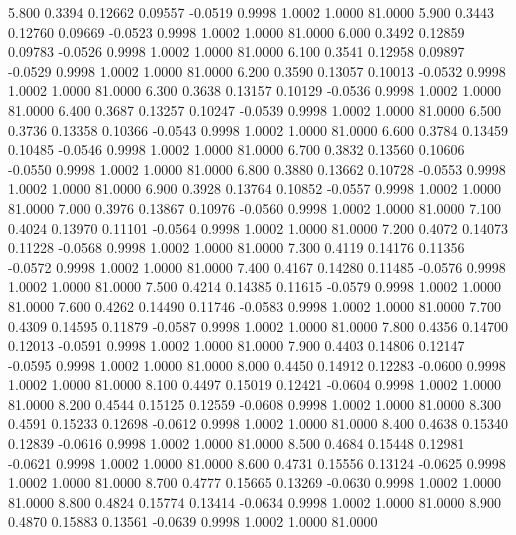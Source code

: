    5.800   0.3394   0.12662   0.09557  -0.0519   0.9998   1.0002   1.0000  81.0000
   5.900   0.3443   0.12760   0.09669  -0.0523   0.9998   1.0002   1.0000  81.0000
   6.000   0.3492   0.12859   0.09783  -0.0526   0.9998   1.0002   1.0000  81.0000
   6.100   0.3541   0.12958   0.09897  -0.0529   0.9998   1.0002   1.0000  81.0000
   6.200   0.3590   0.13057   0.10013  -0.0532   0.9998   1.0002   1.0000  81.0000
   6.300   0.3638   0.13157   0.10129  -0.0536   0.9998   1.0002   1.0000  81.0000
   6.400   0.3687   0.13257   0.10247  -0.0539   0.9998   1.0002   1.0000  81.0000
   6.500   0.3736   0.13358   0.10366  -0.0543   0.9998   1.0002   1.0000  81.0000
   6.600   0.3784   0.13459   0.10485  -0.0546   0.9998   1.0002   1.0000  81.0000
   6.700   0.3832   0.13560   0.10606  -0.0550   0.9998   1.0002   1.0000  81.0000
   6.800   0.3880   0.13662   0.10728  -0.0553   0.9998   1.0002   1.0000  81.0000
   6.900   0.3928   0.13764   0.10852  -0.0557   0.9998   1.0002   1.0000  81.0000
   7.000   0.3976   0.13867   0.10976  -0.0560   0.9998   1.0002   1.0000  81.0000
   7.100   0.4024   0.13970   0.11101  -0.0564   0.9998   1.0002   1.0000  81.0000
   7.200   0.4072   0.14073   0.11228  -0.0568   0.9998   1.0002   1.0000  81.0000
   7.300   0.4119   0.14176   0.11356  -0.0572   0.9998   1.0002   1.0000  81.0000
   7.400   0.4167   0.14280   0.11485  -0.0576   0.9998   1.0002   1.0000  81.0000
   7.500   0.4214   0.14385   0.11615  -0.0579   0.9998   1.0002   1.0000  81.0000
   7.600   0.4262   0.14490   0.11746  -0.0583   0.9998   1.0002   1.0000  81.0000
   7.700   0.4309   0.14595   0.11879  -0.0587   0.9998   1.0002   1.0000  81.0000
   7.800   0.4356   0.14700   0.12013  -0.0591   0.9998   1.0002   1.0000  81.0000
   7.900   0.4403   0.14806   0.12147  -0.0595   0.9998   1.0002   1.0000  81.0000
   8.000   0.4450   0.14912   0.12283  -0.0600   0.9998   1.0002   1.0000  81.0000
   8.100   0.4497   0.15019   0.12421  -0.0604   0.9998   1.0002   1.0000  81.0000
   8.200   0.4544   0.15125   0.12559  -0.0608   0.9998   1.0002   1.0000  81.0000
   8.300   0.4591   0.15233   0.12698  -0.0612   0.9998   1.0002   1.0000  81.0000
   8.400   0.4638   0.15340   0.12839  -0.0616   0.9998   1.0002   1.0000  81.0000
   8.500   0.4684   0.15448   0.12981  -0.0621   0.9998   1.0002   1.0000  81.0000
   8.600   0.4731   0.15556   0.13124  -0.0625   0.9998   1.0002   1.0000  81.0000
   8.700   0.4777   0.15665   0.13269  -0.0630   0.9998   1.0002   1.0000  81.0000
   8.800   0.4824   0.15774   0.13414  -0.0634   0.9998   1.0002   1.0000  81.0000
   8.900   0.4870   0.15883   0.13561  -0.0639   0.9998   1.0002   1.0000  81.0000
